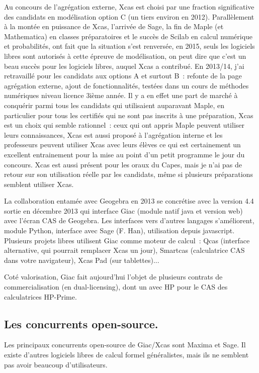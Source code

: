 \documentclass[a4paper,11pt]{article}
\begin{document}
\begin{giacjshere}
Au concours de l'agr\'egation externe,
Xcas est choisi par une fraction
significative des candidats en mod\'elisation option C
(un tiers environ en 2012).
Parall\`element \`a la mont\'ee en
puissance de Xcas, l'arriv\'ee de Sage, la fin de Maple (et
Mathematica) en classes pr\'eparatoires
et le succ\`es de Scilab en calcul num\'erique et probabilit\'es, ont
fait que la situation s'est renvers\'ee, en 2015,
seuls les logiciels libres sont autoris\'es
\`a cette \'epreuve de mod\'elisation, on peut
dire que c'est un beau succ\`es pour les logiciels libres,
auquel Xcas a contribu\'e.
En 2013/14, j'ai retravaill\'e pour les candidats
aux options A et surtout B~: refonte de
la page agr\'egation externe, ajout de fonctionnalit\'es,
test\'ees dans un cours de m\'ethodes num\'eriques
niveau licence 3i\`eme ann\'ee. Il y a en effet une part de march\'e
\`a conqu\'erir parmi tous les candidats qui utilisaient auparavant
Maple, en particulier pour tous les certifi\'es qui
ne sont pas inscrits \`a une pr\'eparation, Xcas est un choix
qui semble rationnel~: ceux qui ont appris Maple peuvent
utiliser leurs connaissances, Xcas est aussi propos\'e
\`a l'agr\'egation interne et les professeurs peuvent utiliser Xcas avec
leurs \'el\`eves ce qui est certainement un excellent entrainement
pour la mise au point d'un petit programme le jour du concours.
Xcas est aussi pr\'esent pour les oraux du Capes, mais je n'ai
pas de retour sur son utilisation r\'eelle par les candidats,
m\^eme si plusieurs pr\'eparations semblent utiliser Xcas.

La collaboration entam\'ee avec Geogebra en 2013
se concr\'etise avec la version 4.4 sortie en d\'ecembre 2013
qui interface Giac (module natif java et version
web) avec l'\'ecran CAS de Geogebra.
Les interfaces vers d'autres langages s'am\'eliorent,
module Python, interface avec Sage (F. Han),
utilisation depuis javascript. Plusieurs projets
libres utilisent Giac comme moteur de calcul~: Qcas (interface
alternative, qui pourrait remplacer Xcas un jour),
Smartcas (calculatrice CAS dans votre navigateur),
Xcas Pad (sur tablettes)...

Cot\'e valorisation, Giac fait aujourd'hui l'objet de
plusieurs contrats de
commercialisation (en dual-licensing), dont un avec HP
pour le CAS des calculatrices HP-Prime.

\subsection{Les concurrents open-source.} \label{sec:concurrents}
Les principaux concurrents open-source de Giac/Xcas sont Maxima et
Sage. Il existe d'autres logiciels libres de calcul formel g\'en\'eralistes, mais ils
ne semblent pas avoir beaucoup d'utilisateurs.


\end{giacjshere}
\end{document}
